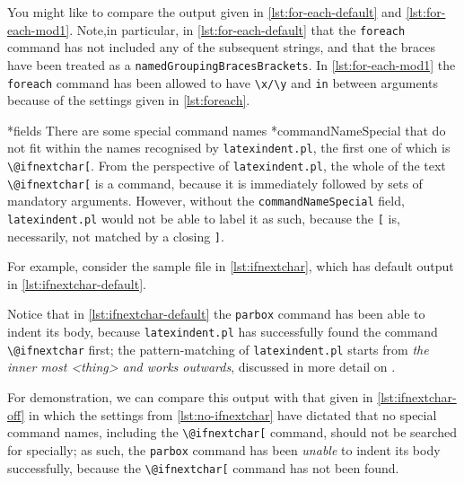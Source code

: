  You might like to compare the output given in \cref{lst:for-each-default} and
 \cref{lst:for-each-mod1}. Note,in particular, in \cref{lst:for-each-default} that the
 \texttt{foreach} command has not included any of the subsequent strings, and that the
 braces have been treated as a \texttt{namedGroupingBracesBrackets}. In
 \cref{lst:for-each-mod1} the \texttt{foreach} command has been allowed to have
 \lstinline!\x/\y! and \texttt{in} between arguments because of the settings given in
 \cref{lst:foreach}.

*{fields}
 There are some special command names *{commandNameSpecial} that do
 not fit within the names recognised by \texttt{latexindent.pl}, the first one of which is
 \lstinline!\@ifnextchar[!. From the perspective of \texttt{latexindent.pl}, the whole of
 the text \lstinline!\@ifnextchar[! is a command, because it is immediately followed by
 sets of mandatory arguments. However, without the \texttt{commandNameSpecial} field,
 \texttt{latexindent.pl} would not be able to label it as such, because the \lstinline![!
 is, necessarily, not matched by a closing \lstinline!]!.%

 For example, consider the sample file in \cref{lst:ifnextchar}, which has default output
 in \cref{lst:ifnextchar-default}.

 \begin{cmhtcbraster}[raster column skip=.1\linewidth]
 \end{cmhtcbraster}

 Notice that in \cref{lst:ifnextchar-default} the \texttt{parbox} command has been able to
 indent its body, because \texttt{latexindent.pl} has successfully found the command
 \lstinline!\@ifnextchar! first; the pattern-matching of \texttt{latexindent.pl} starts
 from \emph{the inner most <thing> and works outwards}, discussed in more detail on
 .

 For demonstration, we can compare this output with that given in
 \cref{lst:ifnextchar-off} in which the settings from \cref{lst:no-ifnextchar} have
 dictated that no special command names, including the \lstinline!\@ifnextchar[! command,
 should not be searched for specially; as such, the \texttt{parbox} command has been
 \emph{unable} to indent its body successfully, because the \lstinline!\@ifnextchar[!
 command has not been found.


